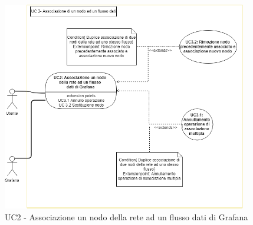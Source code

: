                 		\begin{figure}[!htbp]
		                	\centering
		                	\includegraphics[width=0.95\textwidth]{UC2.png}
		                	\caption{UC2 - Associazione un nodo della rete ad un flusso dati di Grafana}
		                \end{figure}
	                \clearpage
                
